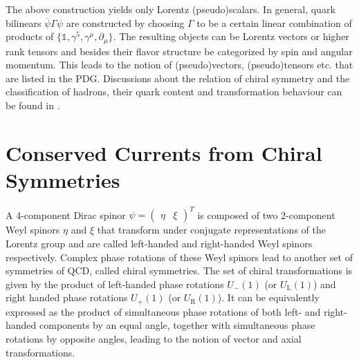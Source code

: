 The above construction yields only Lorentz (pseudo)scalars. In general, quark bilinears $\overline{\psi}\Gamma\psi$ are constructed by choosing $\Gamma$ to be a certain linear combination of products of ${\{\mathbb{1},\gamma^5,\gamma^\mu,\partial_\mu\}}$. The resulting objects can be Lorentz vectors or higher rank tensors and besides their flavor structure be categorized by spin and angular momentum. This leads to the notion of (pseudo)vectors, (pseudo)tensors etc. that are listed in the PDG. Discussions about the relation of chiral symmetry and the classification of hadrons, their quark content and transformation behaviour can be found in \cite{KoenigsteinGiacosa_2016,GiacosaEtAl_2018}.



\section{Conserved Currents from Chiral Symmetries}
\label{sec:ConservedCurrentsChirSym}

A 4-component Dirac spinor ${\psi=\begin{pmatrix}\eta&\xi\end{pmatrix}}^T$ is composed of two 2-component Weyl spinors $\eta$ and $\xi$ that transform under conjugate representations of the Lorentz group and are called left-handed and right-handed Weyl spinors respectively. Complex phase rotations of these Weyl spinors lead to another set of symmetries of QCD, called chiral symmetries. The set of chiral transformations is given by the product of left-handed phase rotations ${U_-(1)}$ (or ${U_{\text{L}}(1)}$) and right handed phase rotations ${U_+(1)}$ (or ${U_{\text{R}}(1)}$). It can be equivalently expressed as the product of simultaneous phase rotations of both left- and right-handed components by an equal angle, together with simultaneous phase rotations by opposite angles, leading to the notion of vector and axial transformations.

